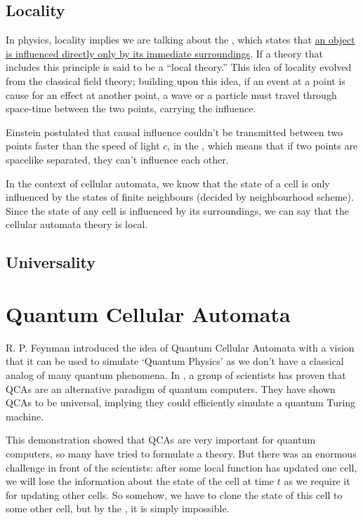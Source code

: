 \documentclass[11pt, oneside]{scrbook}
\begin{document}
\subsection{Locality} \label{ssec: locality}

In physics, locality implies we are talking about the , which states that \uline{an object is influenced directly only by its immediate surroundings}. If a theory that includes this principle is said to be a ``local theory.'' This idea of locality evolved from the classical field theory; building upon this idea, if an event at a point is cause for an effect at another point, a wave or a particle must travel through space-time between the two points, carrying the influence.

Einstein postulated that causal influence couldn't be transmitted between two points faster than the speed of light \(c\), in the , which means that if two points are spacelike separated, they can't influence each other. %

In the context of cellular automata, we know that the state of a cell is only influenced by the states of finite neighbours (decided by neighbourhood scheme). Since the state of any cell is influenced by its surroundings, we can say that the cellular automata theory is local.
\subsection{Universality} \label{ssec: universality}

\section{Quantum Cellular Automata}
R. P. Feynman introduced the idea of Quantum Cellular Automata with a vision that it can be used to simulate `Quantum Physics' as we don't have a classical analog of many quantum phenomena. In \cite{Watrous1995}, a group of scientists has proven that QCAs are an alternative paradigm of quantum computers. They have shown QCAs to be universal, implying they could efficiently simulate a quantum Turing machine.

This demonstration showed that QCAs are very important for quantum computers, so many have tried to formulate a theory. But there was an enormous challenge in front of the scientists: after some local function has updated one cell, we will lose the information about the state of the cell at time \(t\) as we require it for updating other cells. So somehow, we have to clone the state of this cell to some other cell, but by the , it is simply impossible.
\end{document}
